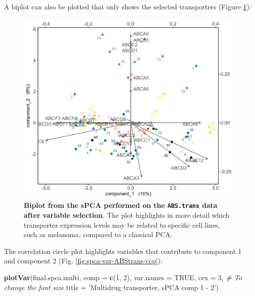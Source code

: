 \documentclass[]{book}
\newenvironment{Shaded}{\begin{snugshade}}{\end{snugshade}}
\newcommand{\KeywordTok}[1]{\textcolor[rgb]{0.13,0.29,0.53}{\textbf{#1}}}
\newcommand{\DataTypeTok}[1]{\textcolor[rgb]{0.13,0.29,0.53}{#1}}
\newcommand{\DecValTok}[1]{\textcolor[rgb]{0.00,0.00,0.81}{#1}}
\newcommand{\StringTok}[1]{\textcolor[rgb]{0.31,0.60,0.02}{#1}}
\newcommand{\CommentTok}[1]{\textcolor[rgb]{0.56,0.35,0.01}{\textit{#1}}}
\newcommand{\OtherTok}[1]{\textcolor[rgb]{0.56,0.35,0.01}{#1}}
\newcommand{\OperatorTok}[1]{\textcolor[rgb]{0.81,0.36,0.00}{\textbf{#1}}}
\newcommand{\NormalTok}[1]{#1}
\begin{document}
A biplot can also be plotted that only shows the selected transporters
(Figure \ref{fig:spca-ABCtrans-biplot}):

\begin{Shaded}
\end{Shaded}

\begin{figure}

{\centering \includegraphics[width=0.5\linewidth]{Figures/PCA/spca-ABCtrans-biplot-1} 

}

\caption{\textbf{Biplot from the sPCA performed on the
\texttt{ABS.trans} data after variable selection}. The plot highlights
in more detail which transporter expression levels may be related to
specific cell lines, such as melanoma, compared to a classical PCA.}\label{fig:spca-ABCtrans-biplot}
\end{figure}






The correlation circle plot highlights variables that contribute to
component 1 and component 2 (Fig. \ref{fig:spca-var-ABStrans-ccp}):

\begin{Shaded}
\begin{Highlighting}[]
\KeywordTok{plotVar}\NormalTok{(final.spca.multi, }\DataTypeTok{comp =} \KeywordTok{c}\NormalTok{(}\DecValTok{1}\NormalTok{, }\DecValTok{2}\NormalTok{), }\DataTypeTok{var.names =} \OtherTok{TRUE}\NormalTok{, }
        \DataTypeTok{cex =} \DecValTok{3}\NormalTok{, }\CommentTok{# To change the font size }
        \DataTypeTok{title =} \StringTok{'Multidrug transporter, sPCA comp 1 - 2'}\NormalTok{)}
\end{Highlighting}
\end{Shaded}
\end{document}
